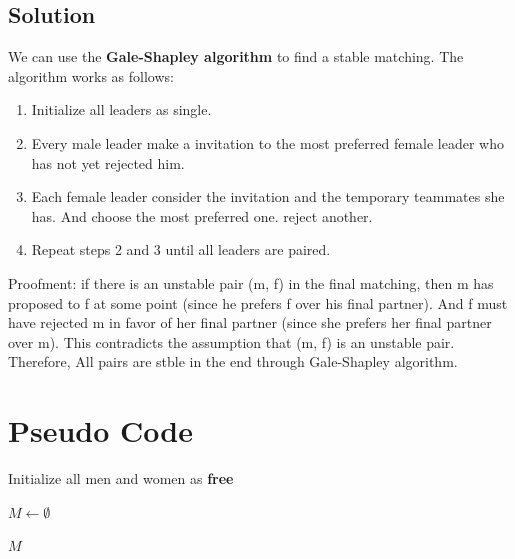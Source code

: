 \documentclass[a4paper,12pt]{article}
\begin{document}
\subsection{Solution}
We can use the \textbf{Gale-Shapley algorithm} to find a stable matching. The algorithm works as follows:
\begin{enumerate}
    \item Initialize all leaders as single.
    \item Every male leader make a invitation to the most preferred female leader who has not yet rejected him.
    \item Each female leader consider the invitation and the temporary teammates she has.
    And choose the most preferred one. reject another.
    \item Repeat steps 2 and 3 until all leaders are paired.
\end{enumerate}
Proofment: if there is an unstable pair (m, f) in the final matching, then m has proposed to f at some point (since he prefers f over his final partner).
And f must have rejected m in favor of her final partner (since she prefers her final partner over m). This contradicts the assumption that (m, f) is an unstable pair.
Therefore, All pairs are stble in the end through Gale-Shapley algorithm.
\section{Pseudo Code}
\begin{algorithm}[H]
    \SetAlgoLined
    \DontPrintSemicolon
    \caption{Gale-Shapley (men-proposing version)}

    Initialize all men and women as \textbf{free}\;

    $M \gets \emptyset$\;

    \Return $M$\;
\end{algorithm}
\end{document}
